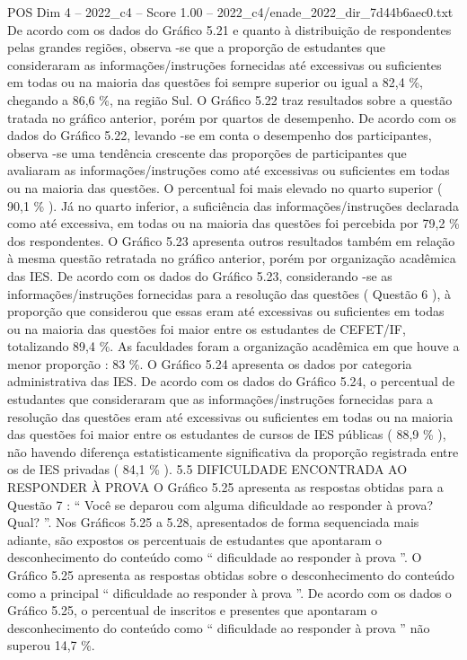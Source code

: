 \begin{textsample}{POS Dim 4 – 2022\_c4 – Score 1.00 – 2022\_c4/enade\_2022\_dir\_7d44b6aec0.txt}
De acordo com os dados do Gráfico 5.21 e quanto à distribuição de respondentes pelas grandes regiões, observa -se que a proporção de estudantes que consideraram as informações/instruções fornecidas até excessivas ou suficientes em todas ou na maioria das questões foi sempre superior ou igual a 82,4 \%, chegando a 86,6 \%, na região Sul.
O Gráfico 5.22 traz resultados sobre a questão tratada no gráfico anterior, porém por quartos de desempenho.
De acordo com os dados do Gráfico 5.22, levando -se em conta o desempenho dos participantes, observa -se uma tendência crescente das proporções de participantes que avaliaram as informações/instruções como até excessivas ou suficientes em todas ou na maioria das questões.
O percentual foi mais elevado no quarto superior ( 90,1 \% ).
Já no quarto inferior, a suficiência das informações/instruções declarada como até excessiva, em todas ou na maioria das questões foi percebida por 79,2 \% dos respondentes.
O Gráfico 5.23 apresenta outros resultados também em relação à mesma questão retratada no gráfico anterior, porém por organização acadêmica das IES.
De acordo com os dados do Gráfico 5.23, considerando -se as informações/instruções fornecidas para a resolução das questões ( Questão 6 ), à proporção que considerou que essas eram até excessivas ou suficientes em todas ou na maioria das questões foi maior entre os estudantes de CEFET/IF, totalizando 89,4 \%.
As faculdades foram a organização acadêmica em que houve a menor proporção : 83 \%.
O Gráfico 5.24 apresenta os dados por categoria administrativa das IES.
De acordo com os dados do Gráfico 5.24, o percentual de estudantes que consideraram que as informações/instruções fornecidas para a resolução das questões eram até excessivas ou suficientes em todas ou na maioria das questões foi maior entre os estudantes de cursos de IES públicas ( 88,9 \% ), não havendo diferença estatisticamente significativa da proporção registrada entre os de IES privadas ( 84,1 \% ). 5.5 DIFICULDADE ENCONTRADA AO RESPONDER À PROVA O Gráfico 5.25 apresenta as respostas obtidas para a Questão 7 : “ Você se deparou com alguma dificuldade ao responder à prova?
Qual? ”.
Nos Gráficos 5.25 a 5.28, apresentados de forma sequenciada mais adiante, são expostos os percentuais de estudantes que apontaram o desconhecimento do conteúdo como “ dificuldade ao responder à prova ”.
O Gráfico 5.25 apresenta as respostas obtidas sobre o desconhecimento do conteúdo como a principal “ dificuldade ao responder à prova ”.
De acordo com os dados o Gráfico 5.25, o percentual de inscritos e presentes que apontaram o desconhecimento do conteúdo como “ dificuldade ao responder à prova ” não superou 14,7 \%.

\end{textsample}
